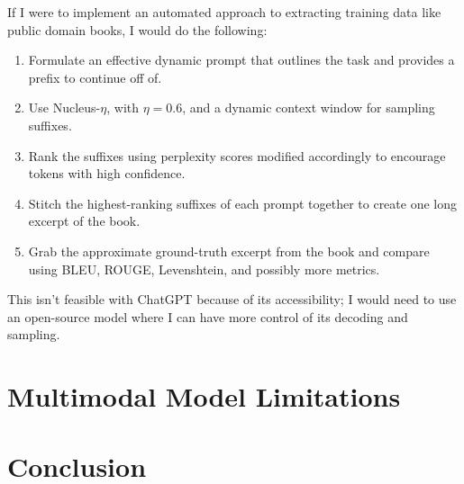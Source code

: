 \documentclass{article}
\begin{document}
	If I were to implement an automated approach to extracting training data like public domain books, I would do the following:
	\begin{enumerate}
		\item Formulate an effective dynamic prompt that outlines the task and provides a prefix to continue off of.
		\item Use Nucleus-$\eta$, with $\eta=0.6$, and a dynamic context window for sampling suffixes.
		\item Rank the suffixes using perplexity scores modified accordingly to encourage tokens with high confidence.
		\item Stitch the highest-ranking suffixes of each prompt together to create one long excerpt of the book.
		\item Grab the approximate ground-truth excerpt from the book and compare using BLEU, ROUGE, Levenshtein, and possibly more metrics.
	\end{enumerate}

	This isn't feasible with ChatGPT because of its accessibility; I would need to use an open-source model where I can have more control of its decoding and sampling.
	
	\section{Multimodal Model Limitations}
	
	
	\section{Conclusion}
	
	
\end{document}
